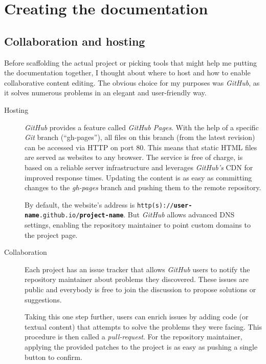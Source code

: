 \section{Creating the documentation}

\subsection{Collaboration and hosting}

Before scaffolding the actual project or picking tools that might help me putting the documentation together, I thought about where to host and how to enable collaborative content editing. The obvious choice for my purposes was \textit{GitHub}, as it solves numerous problems in an elegant and user-friendly way.

\begin{description}

	\item[Hosting]\hfill

	\textit{GitHub} provides a feature called \textit{GitHub Pages}. With the help of a specific \textit{Git} branch (\enquote{gh-pages}), all files on this branch (from the latest revision) can be accessed via \ac{HTTP} on port 80. This means that static \ac{HTML} files are served as websites to any browser. The service is free of charge, is based on a reliable server infrastructure and leverages \textit{GitHub's} \ac{CDN} for improved response times. Updating the content is as easy as committing changes to the \textit{gh-pages} branch and pushing them to the remote repository.

	By default, the website's address is \texttt{http(s)://\allowbreak\textbf{user-name}.github.io/\allowbreak\textbf{project-name}}. But \textit{GitHub} allows advanced \ac{DNS} settings, enabling the repository maintainer to point custom domains to the project page.

	\item[Collaboration]\hfill

	Each project has an issue tracker that allows \textit{GitHub} users to notify the repository maintainer about problems they discovered. These issues are public and everybody is free to join the discussion to propose solutions or suggestions.

	Taking this one step further, users can enrich issues by adding code (or textual content) that attempts to solve the problems they were facing. This procedure is then called a \textit{pull-request}. For the repository maintainer, applying the provided patches to the project is as easy as pushing a single button to confirm.


\end{description}
